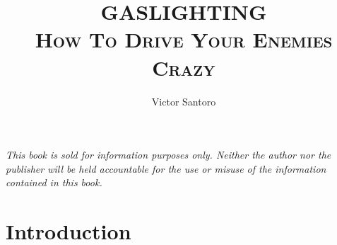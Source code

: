 \documentclass{book}
\begin{document}
\title{\textbf{GASLIGHTING} \\ \vspace{1em}\Large \textsc{How To Drive Your Enemies Crazy}}
\author{Victor Santoro}
\date{}

\maketitle

\begin{center}
    \textit{
        This book is sold for information purposes only. Neither the 
        author nor the publisher will be held accountable for the use or 
        misuse of the information contained in this book. 
    }
\end{center}

\tableofcontents

\chapter*{Introduction}
\end{document}

